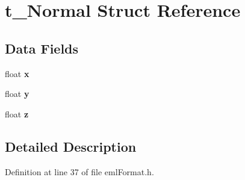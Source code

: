 \hypertarget{structt___normal}{}\section{t\+\_\+\+Normal Struct Reference}
\label{structt___normal}
\subsection*{Data Fields}
\begin{DoxyCompactItemize}
\item 
float {\bfseries x}\hypertarget{structt___normal_a230d3b5f86bc51cc14fd78b1eaadae72}{}\label{structt___normal_a230d3b5f86bc51cc14fd78b1eaadae72}

\item 
float {\bfseries y}\hypertarget{structt___normal_a1bef71368aeda705c0f7a092129b26d6}{}\label{structt___normal_a1bef71368aeda705c0f7a092129b26d6}

\item 
float {\bfseries z}\hypertarget{structt___normal_af686e4d9888ddad50dee46c47306b8c5}{}\label{structt___normal_af686e4d9888ddad50dee46c47306b8c5}

\end{DoxyCompactItemize}


\subsection{Detailed Description}


Definition at line 37 of file eml\+Format.\+h.

